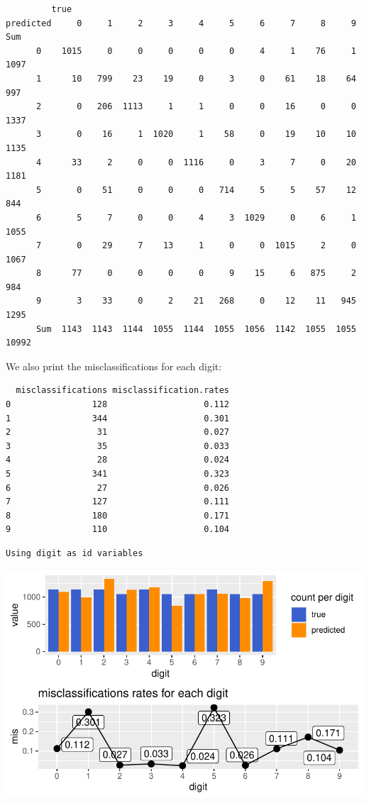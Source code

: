 \documentclass[
  letterpaper,
  DIV=11,
  numbers=noendperiod]{scrartcl}
\begin{document}
\begin{verbatim}
         true
predicted     0     1     2     3     4     5     6     7     8     9   Sum
      0    1015     0     0     0     0     0     4     1    76     1  1097
      1      10   799    23    19     0     3     0    61    18    64   997
      2       0   206  1113     1     1     0     0    16     0     0  1337
      3       0    16     1  1020     1    58     0    19    10    10  1135
      4      33     2     0     0  1116     0     3     7     0    20  1181
      5       0    51     0     0     0   714     5     5    57    12   844
      6       5     7     0     0     4     3  1029     0     6     1  1055
      7       0    29     7    13     1     0     0  1015     2     0  1067
      8      77     0     0     0     0     9    15     6   875     2   984
      9       3    33     0     2    21   268     0    12    11   945  1295
      Sum  1143  1143  1144  1055  1144  1055  1056  1142  1055  1055 10992
\end{verbatim}

We also print the misclassifications for each digit:

\begin{verbatim}
  misclassifications misclassification.rates
0                128                   0.112
1                344                   0.301
2                 31                   0.027
3                 35                   0.033
4                 28                   0.024
5                341                   0.323
6                 27                   0.026
7                127                   0.111
8                180                   0.171
9                110                   0.104
\end{verbatim}

\begin{verbatim}
Using digit as id variables
\end{verbatim}

\includegraphics{ProblemSet2_files/figure-pdf/unnamed-chunk-71-1.pdf}
\end{document}
